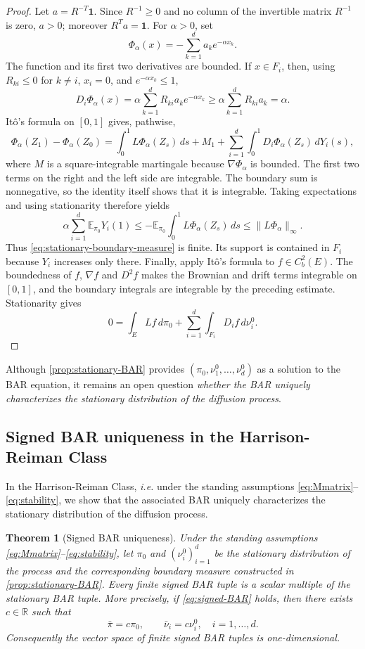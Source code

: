 \documentclass[aihp]{imsart}
\numberwithin{equation}{section}
\theoremstyle{plain}
\newtheorem{theorem}{Theorem}[section]
\theoremstyle{definition}
\newcommand{\1}{\mathbf 1}
\begin{document}
\begin{proof}
Let $a=R^{-T}\mathbf 1$. Since $R^{-1}\ge0$ and no column of the invertible matrix $R^{-1}$ is zero, $a>0$; moreover $R^Ta=\mathbf 1$. For $\alpha>0$, set
\[
 \Phi_\alpha(x)=-\sum_{k=1}^d a_k e^{-\alpha x_k}.
\]
The function and its first two derivatives are bounded. If $x\in F_i$, then, using $R_{ki}\le0$ for $k\ne i$, $x_i=0$, and $e^{-\alpha x_k}\le1$,
\[
 D_i\Phi_\alpha(x)
 =\alpha\sum_{k=1}^dR_{ki}a_ke^{-\alpha x_k}
 \ge\alpha\sum_{k=1}^dR_{ki}a_k=\alpha.
\]
It\^o's formula on $[0,1]$ gives, pathwise,
\[
 \Phi_\alpha(Z_1)-\Phi_\alpha(Z_0)
 =\int_0^1L\Phi_\alpha(Z_s)\,ds
 +M_1
 +\sum_{i=1}^d\int_0^1D_i\Phi_\alpha(Z_s)\,dY_i(s),
\]
where $M$ is a square-integrable martingale because $\nabla\Phi_\alpha$ is bounded. The first two terms on the right and the left side are integrable. The boundary sum is nonnegative, so the identity itself shows that it is integrable. Taking expectations and using stationarity therefore yields
\[
 \alpha\sum_{i=1}^d\mathbb E_{\pi_0}Y_i(1)
 \le -\mathbb E_{\pi_0}\int_0^1L\Phi_\alpha(Z_s)\,ds
 \le \|L\Phi_\alpha\|_\infty.
\]
Thus \eqref{eq:stationary-boundary-measure} is finite. Its support is contained in $F_i$ because $Y_i$ increases only there. Finally, apply It\^o's formula to $f\in C_b^2(E)$. The boundedness of $f$, $\nabla f$ and $D^2f$ makes the Brownian and drift terms integrable on $[0,1]$, and the boundary integrals are integrable by the preceding estimate. Stationarity gives
\[
 0=\int_ELf\,d\pi_0+\sum_{i=1}^d\int_{F_i}D_if\,d\nu_i^0.
\]
\end{proof}

Although \cref{prop:stationary-BAR} provides $(\pi_0,\nu_1^0,\dots,\nu_d^0)$ as a solution to the BAR equation, it remains an open question \emph{whether the BAR uniquely characterizes the stationary distribution of the diffusion process}.

\subsection{Signed BAR uniqueness in the Harrison-Reiman Class} In the Harrison-Reiman Class, \emph{i.e.} under the standing assumptions \eqref{eq:Mmatrix}--\eqref{eq:stability}, we show that the associated BAR uniquely characterizes the
stationary distribution of the diffusion process.

\begin{theorem}[Signed BAR uniqueness]\label{thm:main}
Under the standing assumptions \eqref{eq:Mmatrix}--\eqref{eq:stability}, let $\pi_0$ and $(\nu_i^0)_{i=1}^d$ be the stationary distribution of the process and the corresponding boundary measure constructed in \cref{prop:stationary-BAR}. Every finite signed BAR tuple is a scalar multiple of the stationary BAR tuple. More precisely, if \eqref{eq:signed-BAR} holds, then there exists $c\in\mathbb R$ such that
\begin{equation}\label{eq:main-conclusion}
 \bar\pi=c\pi_0,
 \qquad
 \bar\nu_i=c\nu_i^0,
 \quad i=1,\ldots,d.
\end{equation}
Consequently the vector space of finite signed BAR tuples is one-dimensional.
\end{theorem}
\end{document}
